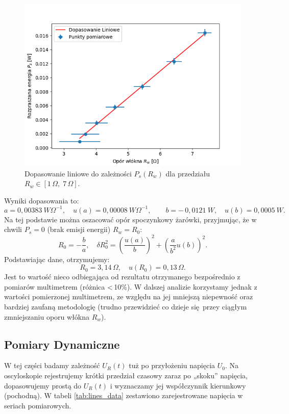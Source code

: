 \documentclass[12pt]{article}
\begin{document}
\begin{figure}[H]
    \centering
    \includegraphics[scale=0.58]{pomiary_moc_linia}
    \caption{Dopasowanie liniowe do zależności $P_s(R_w)$ dla przedziału $R_w \in [1\,\Omega,\; 7\,\Omega]$.}
    \label{fig:power_res_line}
\end{figure}
Wyniki dopasowania to:
\[
    a = 0{,}00383 \ W\Omega^{-1}, \quad u(a) = 0{,}00008 \ W\Omega^{-1}, \qquad
    b = -\,0{,}0121 \ W, \quad u(b) = 0{,}0005 \ W.
\]
Na tej podstawie można oszacować opór spoczynkowy żarówki, przyjmując, że w chwili $P_s = 0$ (brak emisji energii) $R_w = R_0$:
\begin{equation}
    R_0 = -\frac{b}{a}, 
    \quad
    \delta R_0^2 = \left(\frac{u(a)}{b}\right)^2 + \left(\frac{a}{b^2}u(b)\right)^2.
\end{equation}
Podstawiając dane, otrzymujemy:
\[
    R_0 = 3{,}14\,\Omega, \quad u(R_0) = 0{,}13\,\Omega.
\]
Jest to wartość nieco odbiegająca od rezultatu otrzymanego bezpośrednio z pomiarów multimetrem (różnica <\,10\%). 
W dalszej analizie korzystamy jednak z wartości pomierzonej multimetrem, ze względu na jej mniejszą niepewność oraz bardziej zaufaną metodologię (trudno przewidzieć co dzieje się przey ciągłym zmniejszaniu oporu włókna $R_w$).

\subsection{Pomiary Dynamiczne}
W tej części badamy zależność $U_R(t)$ tuż po przyłożeniu napięcia $U_0$. Na oscyloskopie rejestrujemy krótki przedział czasowy zaraz po „skoku” napięcia, dopasowujemy prostą do $U_R(t)$ i wyznaczamy jej współczynnik kierunkowy (pochodną). W tabeli \ref{tab:lines_data} zestawiono zarejestrowane napięcia w seriach pomiarowych.
\end{document}
